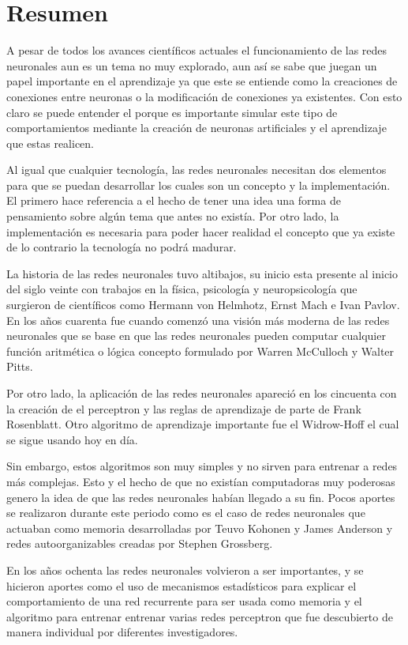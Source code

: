 \documentclass{article}
\begin{document}
	\section{Resumen}
A pesar de todos los avances científicos actuales el funcionamiento de las redes neuronales aun es un tema no muy explorado, aun así se sabe que juegan un papel importante en el aprendizaje ya que este se entiende como la creaciones de conexiones entre neuronas o la modificación de conexiones ya existentes. Con esto claro se puede entender el porque es importante simular este tipo de comportamientos mediante la creación de neuronas artificiales y el aprendizaje que estas realicen.

Al igual que cualquier tecnología, las redes neuronales necesitan dos elementos para que se puedan desarrollar los cuales son un concepto y la implementación. El primero hace referencia a el hecho de tener una idea una forma de pensamiento sobre algún tema que antes no existía. Por otro lado, la implementación es necesaria para poder hacer realidad el concepto que ya existe de lo contrario la tecnología no podrá madurar.

La historia de las redes neuronales tuvo altibajos, su inicio esta presente al inicio del siglo veinte con trabajos en la física, psicología y neuropsicología que surgieron de científicos como Hermann von Helmhotz, Ernst Mach e Ivan Pavlov. En los años cuarenta fue cuando comenzó una visión más moderna de las redes neuronales que se base en que las redes neuronales pueden computar cualquier función aritmética o lógica concepto formulado por Warren McCulloch y Walter Pitts.

Por otro lado, la aplicación de las redes neuronales apareció en los cincuenta con la creación de el perceptron y las reglas de aprendizaje de parte de Frank Rosenblatt. Otro algoritmo de aprendizaje importante fue el Widrow-Hoff el cual se sigue usando hoy en día. 

Sin embargo, estos algoritmos son muy simples y no sirven para entrenar a redes más complejas. Esto y el hecho de que no existían computadoras muy poderosas genero la idea de que las redes neuronales habían llegado a su fin. Pocos aportes se realizaron durante este periodo como es el caso de redes neuronales que actuaban como memoria desarrolladas por Teuvo Kohonen y James Anderson y redes autoorganizables creadas por Stephen Grossberg.

En los años ochenta las redes neuronales volvieron a ser importantes, y se hicieron aportes como el uso de mecanismos estadísticos para explicar el comportamiento de una red recurrente para ser usada como memoria y el algoritmo para entrenar entrenar varias redes perceptron que fue descubierto de manera individual por diferentes investigadores.
\end{document}
